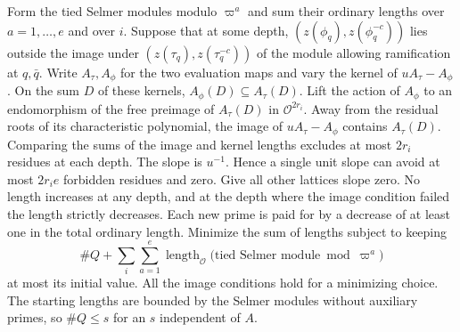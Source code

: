 Form the tied Selmer modules modulo \(\varpi^a\) and sum their
ordinary lengths over \(a=1,\ldots,e\) and over \(i\). Suppose that
at some depth, \((z(\phi_q),z(\phi_q^{-c}))\) lies outside the image
under \((z(\tau_q),z(\tau_q^{-c}))\) of the module allowing
ramification at \(q,\bar q\). Write \(A_\tau,A_\phi\) for the
two evaluation maps and vary the kernel of \(u A_\tau-A_\phi\).
On the sum \(D\) of these kernels, \(A_\phi(D)\subseteq A_\tau(D)\).
Lift the action of \(A_\phi\) to an endomorphism of the free
preimage of \(A_\tau(D)\) in \(\mathcal O^{2r_i}\).
Away from the residual roots of its characteristic polynomial,
the image of \(u A_\tau-A_\phi\) contains \(A_\tau(D)\). Comparing
the sums of the image and kernel lengths excludes at most \(2r_i\)
residues at each depth. The slope is \(u^{-1}\). Hence a single unit slope can avoid at most \(2r_i e\)
forbidden residues and zero. Give all other lattices slope zero.
No length increases at any depth, and at the depth where the image
condition failed the length strictly decreases. Each new prime is paid
for by a decrease of at least one in the total ordinary length.
Minimize the sum of lengths subject to keeping
\[
 \#Q+\sum_i\sum_{a=1}^e
     \operatorname{length}_{\mathcal O}
        \bigl(\text{tied Selmer module}\bmod\varpi^a\bigr)
\]
at most its initial value. All the image conditions hold for a
minimizing choice. The starting lengths are bounded by the Selmer
modules without auxiliary primes, so \(\#Q\le s\) for an \(s\)
independent of \(A\).

